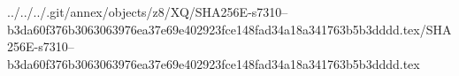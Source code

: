 ../../../.git/annex/objects/z8/XQ/SHA256E-s7310--b3da60f376b3063063976ea37e69e402923fce148fad34a18a341763b5b3dddd.tex/SHA256E-s7310--b3da60f376b3063063976ea37e69e402923fce148fad34a18a341763b5b3dddd.tex